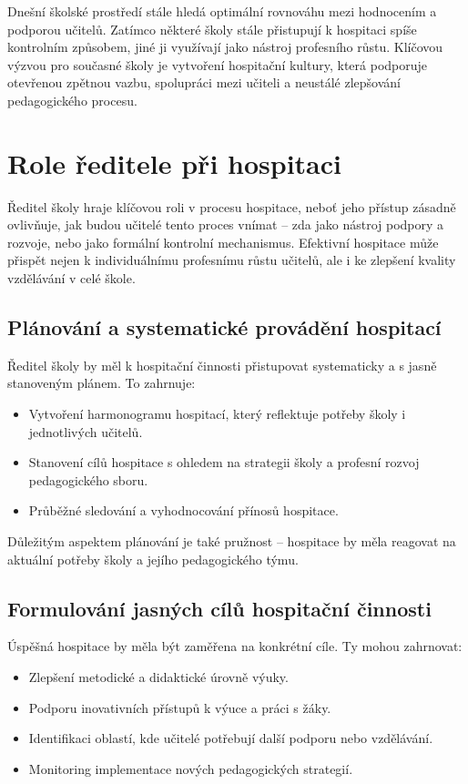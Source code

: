 Dnešní školské prostředí stále hledá optimální rovnováhu mezi hodnocením a podporou učitelů. Zatímco některé školy stále přistupují k hospitaci spíše kontrolním způsobem, jiné ji využívají jako nástroj profesního růstu. Klíčovou výzvou pro současné školy je vytvoření hospitační kultury, která podporuje otevřenou zpětnou vazbu, spolupráci mezi učiteli a neustálé zlepšování pedagogického procesu.


\section{Role ředitele při hospitaci}

Ředitel školy hraje klíčovou roli v procesu hospitace, neboť jeho přístup zásadně ovlivňuje, jak budou učitelé tento proces vnímat – zda jako nástroj podpory a rozvoje, nebo jako formální kontrolní mechanismus. Efektivní hospitace může přispět nejen k individuálnímu profesnímu růstu učitelů, ale i ke zlepšení kvality vzdělávání v celé škole.

\subsection{Plánování a systematické provádění hospitací}
Ředitel školy by měl k hospitační činnosti přistupovat systematicky a s jasně stanoveným plánem. To zahrnuje:

\begin{itemize}
    \item Vytvoření harmonogramu hospitací, který reflektuje potřeby školy i jednotlivých učitelů.
    \item Stanovení cílů hospitace s ohledem na strategii školy a profesní rozvoj pedagogického sboru.
    \item Průběžné sledování a vyhodnocování přínosů hospitace.
\end{itemize}

Důležitým aspektem plánování je také pružnost – hospitace by měla reagovat na aktuální potřeby školy a jejího pedagogického týmu.

\subsection{Formulování jasných cílů hospitační činnosti}
Úspěšná hospitace by měla být zaměřena na konkrétní cíle. Ty mohou zahrnovat:

\begin{itemize}
    \item Zlepšení metodické a didaktické úrovně výuky.
    \item Podporu inovativních přístupů k výuce a práci s žáky.
    \item Identifikaci oblastí, kde učitelé potřebují další podporu nebo vzdělávání.
    \item Monitoring implementace nových pedagogických strategií.
\end{itemize}

